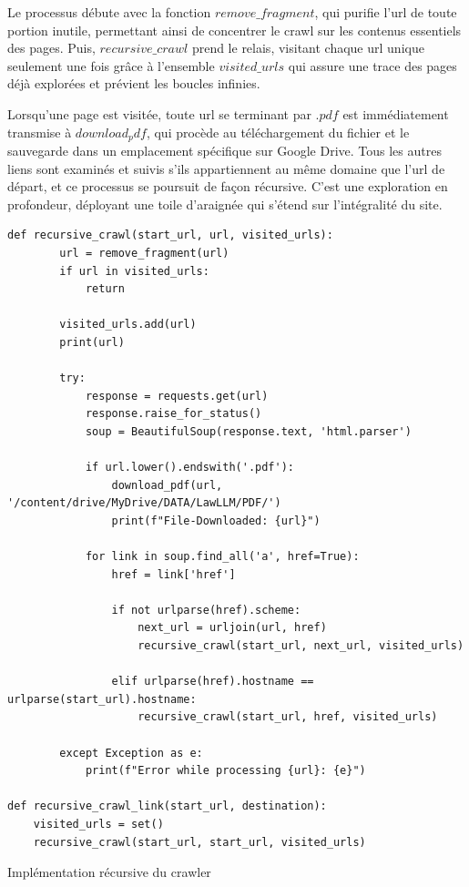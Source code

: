  Le processus débute avec la fonction $remove\_fragment$, qui purifie l'\ac{url} de toute portion inutile, permettant ainsi de concentrer le crawl sur les contenus essentiels des pages. Puis, $recursive\_crawl$ prend le relais, visitant chaque \ac{url} unique seulement une fois grâce à l'ensemble $visited\_urls$ qui assure une trace des pages déjà explorées et prévient les boucles infinies.

Lorsqu'une page est visitée, toute \ac{url} se terminant par $.pdf$ est immédiatement transmise à $download_pdf$, qui procède au téléchargement du fichier et le sauvegarde dans un emplacement spécifique sur Google Drive. Tous les autres liens sont examinés et suivis s'ils appartiennent au même domaine que l'\ac{url} de départ, et ce processus se poursuit de façon récursive. C'est une exploration en profondeur, déployant une toile d'araignée qui s'étend sur l'intégralité du site.

\begin{listing}[!ht]
\begin{verbatim}
def recursive_crawl(start_url, url, visited_urls):
        url = remove_fragment(url)
        if url in visited_urls:
            return

        visited_urls.add(url)
        print(url)

        try:
            response = requests.get(url)
            response.raise_for_status()
            soup = BeautifulSoup(response.text, 'html.parser')

            if url.lower().endswith('.pdf'):
                download_pdf(url, '/content/drive/MyDrive/DATA/LawLLM/PDF/')
                print(f"File-Downloaded: {url}")

            for link in soup.find_all('a', href=True):
                href = link['href']

                if not urlparse(href).scheme:
                    next_url = urljoin(url, href)
                    recursive_crawl(start_url, next_url, visited_urls)

                elif urlparse(href).hostname == urlparse(start_url).hostname:
                    recursive_crawl(start_url, href, visited_urls)

        except Exception as e:
            print(f"Error while processing {url}: {e}")

def recursive_crawl_link(start_url, destination):
    visited_urls = set()
    recursive_crawl(start_url, start_url, visited_urls)
\end{verbatim}
\caption{Implémentation récursive du crawler}
\label{appendix:code:python:remove-fragment}
\end{listing}

